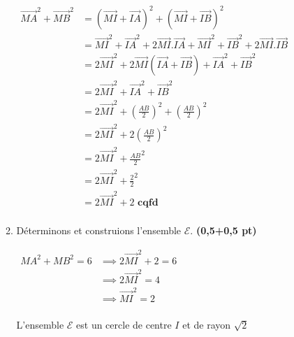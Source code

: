 \documentclass[12pt,a4paper]{article}
\begin{document}
\begin{enumerate}
\begin{enumerate}
        \( 
        \begin{aligned}
        \overrightarrow{MA}^2 + \overrightarrow{MB}^2 &= (\overrightarrow{MI}+\overrightarrow{IA})^2 + (\overrightarrow{MI}+\overrightarrow{IB})^2\\
        &= \overrightarrow{MI}^2+\overrightarrow{IA}^2+2\overrightarrow{MI}.\overrightarrow{IA}+ \overrightarrow{MI}^2+\overrightarrow{IB}^2+2\overrightarrow{MI}.\overrightarrow{IB}\\
        &= 2\overrightarrow{MI}^2+2\overrightarrow{MI}(\overrightarrow{IA}+\overrightarrow{IB})+\overrightarrow{IA}^2+\overrightarrow{IB}^2\\
        &= 2\overrightarrow{MI}^2+\overrightarrow{IA}^2+\overrightarrow{IB}^2\\
        &= 2\overrightarrow{MI}^2+\left( \frac{AB}{2}\right)^2+\left( \frac{AB}{2}\right)^{2}\\
        &= 2\overrightarrow{MI}^2+2\left( \frac{AB}{2}\right)^2\\
        &= 2\overrightarrow{MI}^2+\frac{AB}{2}^2\\
        &= 2\overrightarrow{MI}^2+\frac{2}{2}^2\\
        &= 2\overrightarrow{MI}^2+2 \textbf{ cqfd}\\
				\end{aligned}                
         \)
        \item Déterminons et construions l'ensemble \( \mathcal{E} \). \hfill \textbf{(0,5+0,5 pt)}
        
        \(
        \begin{aligned}
        MA^2 + MB^2 = 6 &\implies 2\overrightarrow{MI}^2+2 = 6\\
        								&\implies 2\overrightarrow{MI}^2   = 4\\
        								&\implies \overrightarrow{MI}^2   = 2\\
        \end{aligned}
         \)
         
         L'ensemble \( \mathcal{E} \) est un cercle de centre \(I\) et de rayon \( \sqrt{2} \)
         

\end{enumerate}
\end{enumerate}
\end{document}
